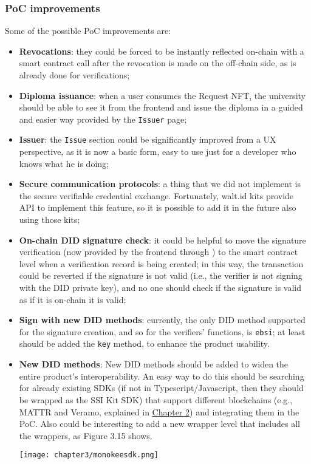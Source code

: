 \subsubsection{PoC improvements}
Some of the possible PoC improvements are:
\begin{itemize}
    \item \textbf{Revocations}: they could be forced to be instantly reflected on-chain
    with a smart contract call after the revocation is made on the off-chain side, as
    is already done for verifications;
    \item \textbf{Diploma issuance}: when a user consumes the Request NFT, the university
    should be able to see it from the frontend and issue the diploma in a guided and
    easier way provided by the \texttt{Issuer} page;
    \item \textbf{Issuer}: the \texttt{Issue} section could be significantly improved from
    a UX perspective, as it is now a basic form, easy to use just for a developer who
    knows what he is doing;
    \item \textbf{Secure communication protocols}: a thing that we did not implement is the
    secure verifiable credential exchange. Fortunately, walt.id kits provide API to
    implement this feature, so it is possible to add it in the future also using those kits;
    \item \textbf{On-chain DID signature check}: it could be helpful to move the signature 
    verification (now provided by the frontend through ) to the 
    smart contract level when a verification record is being created;
    in this way, the transaction could be reverted if the signature is not valid (i.e., 
    the verifier is not signing with the DID private key), and no one should check if 
    the signature is valid as if it is on-chain it is valid;
    \item \textbf{Sign with new DID methods}: currently, the only DID method supported 
    for the signature creation, and so for the verifiers' functions, is \texttt{ebsi}; 
    at least should be added the \texttt{key} method, to enhance the product usability.
    \item \textbf{New DID methods}: New DID methods should be added to widen the entire 
    product's interoperability. An easy way to do this should be searching for already 
    existing SDKs (if not in Typescript/Javascript, then they should be wrapped as the 
    SSI Kit SDK) that support different blockchains (e.g., MATTR and Veramo, explained
    in \hyperref[otherSDKs]{Chapter 2}) and integrating them in the PoC. Also could be 
    interesting to add a new wrapper level that includes all the wrappers, as Figure 
    3.15 shows.
    \begin{center}
        \hspace{-1cm}
        \texttt{[image: chapter3/monokeesdk.png]}
        \vspace{-0.3cm}
    \end{center}
\end{itemize}
